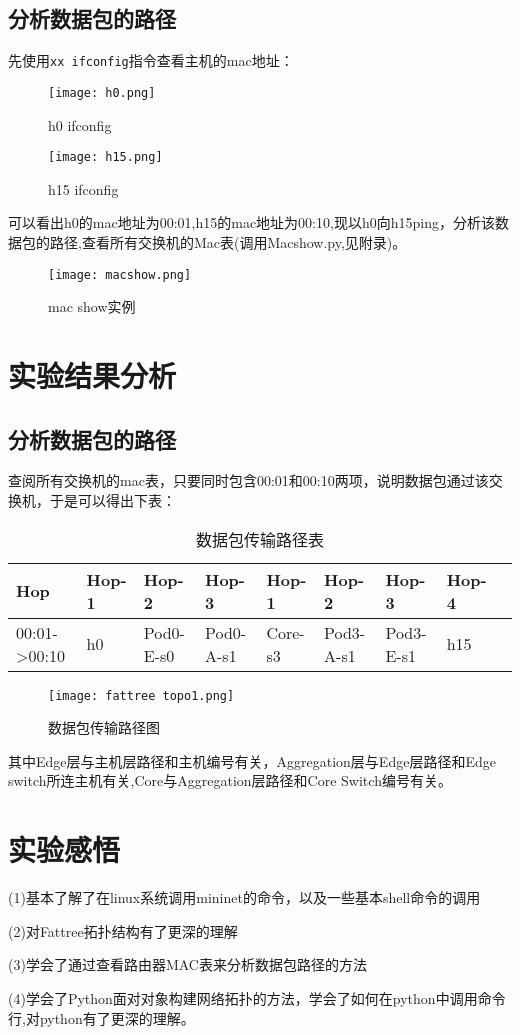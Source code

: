 \documentclass{xjtureport}
\begin{document}
\subsection{分析数据包的路径}
先使用\texttt{xx ifconfig}指令查看主机的mac地址：
\begin{figure}[H]
	\centering
	\texttt{[image: h0.png]}
	\caption{h0 ifconfig}
\end{figure}
\begin{figure}[H]
	\centering
	\texttt{[image: h15.png]}
	\caption{h15 ifconfig}
\end{figure}
可以看出h0的mac地址为00:01,h15的mac地址为00:10,现以h0向h15ping，分析该数据包的路径,查看所有交换机的Mac表(调用Macshow.py,见附录)。
\begin{figure}[H]
	\centering
	\texttt{[image: macshow.png]}
	\caption{mac show实例}
\end{figure}
\section{实验结果分析}
\subsection{分析数据包的路径}
查阅所有交换机的mac表，只要同时包含00:01和00:10两项，说明数据包通过该交换机，于是可以得出下表：
\begin{table}[H]
	\begin{center}
		\begin{tabular}{lllllllll}
			\toprule
			Hop & Hop-1 & Hop-2 & Hop-3 & Hop-1 & Hop-2 & Hop-3 & Hop-4  \\
			\midrule
			00:01->00:10  & h0 & Pod0-E-s0 & Pod0-A-s1 & Core-s3 & Pod3-A-s1 & Pod3-E-s1 & h15  \\
			\bottomrule
		\end{tabular}
	\end{center}
	\caption{数据包传输路径表}
\end{table}
\begin{figure}[H]
	\centering
	\texttt{[image: fattree topo1.png]}
	\caption{数据包传输路径图}
\end{figure}
其中Edge层与主机层路径和主机编号有关，Aggregation层与Edge层路径和Edge switch所连主机有关,Core与Aggregation层路径和Core Switch编号有关。
\section{实验感悟}
(1)基本了解了在linux系统调用mininet的命令，以及一些基本shell命令的调用\par
(2)对Fattree拓扑结构有了更深的理解\par
(3)学会了通过查看路由器MAC表来分析数据包路径的方法\par
(4)学会了Python面对对象构建网络拓扑的方法，学会了如何在python中调用命令行,对python有了更深的理解。
\end{document}
